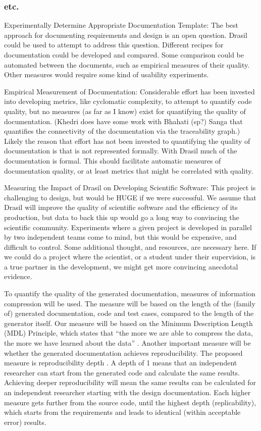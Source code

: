 \documentclass[12pt]{article}
\begin{document}
\subsubsection{etc.}

Experimentally Determine Appropriate Documentation Template: The best approach
for documenting requirements and design is an open question.  Drasil could be
used to attempt to address this question.  Different recipes for documentation
could be developed and compared.  Some comparison could be automated between the
documents, such as empirical measures of their quality.  Other measures would
require some kind of usability experiments.

Empirical Measurement of Documentation: Considerable effort has been invested
into developing metrics, like cyclomatic complexity, to attempt to quantify code
quality, but no measures (as far as I know) exist for quantifying the quality of
documentation.  (Khedri does have some work with Bhahati (sp?) Sanga that
quantifies the connectivity of the documentation via the traceability graph.)
Likely the reason that effort has not been invested to quantifying the quality
of documentation is that is not represented formally.  With Drasil much of the
documentation is formal.  This should facilitate automatic measures of
documentation quality, or at least metrics that might be correlated with
quality.

Measuring the Impact of Drasil on Developing Scientific Software: This project
is challenging to design, but would be HUGE if we were successful.  We assume
that Drasil will improve the quality of scientific software and the efficiency
of its production, but data to back this up would go a long way to convincing
the scientific community.  Experiments where a given project is developed in
parallel by two independent teams come to mind, but this would be expensive, and
difficult to control.  Some additional thought, and resources, are necessary
here.  If we could do a project where the scientist, or a student under their
supervision, is a true partner in the development, we might get more convincing
anecdotal evidence.

To quantify the quality of the generated documentation, measures of information
compression will be used.  The measure will be based on the length of the
(family of) generated documentation, code and test cases, compared to the length
of the generator itself.  Our measure will be based on the Minimum Description
Length (MDL) Principle, which states that ``the more we are able to compress the
data, the more we have learned about the data'' \citep{Grunwald2004}.  Another
important measure will be whether the generated documentation achieves
reproducibility. The proposed measure is reproducibility depth
\citep{Soergel2014}.  A depth of 1 means that an independent researcher can
start from the generated code and calculate the same results.  Achieving deeper
reproducibility will mean the same results can be calculated for an independent
researcher starting with the design documentation.  Each higher measure gets
further from the source code, until the highest depth (replicability), which
starts from the requirements and leads to identical (within acceptable error)
results.
\end{document}
